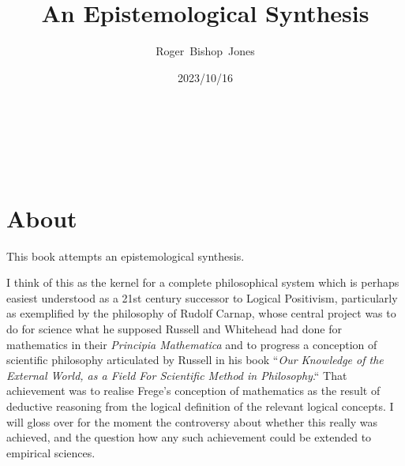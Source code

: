 \documentclass[10pt,titlepage]{book}
\title{\bf An Epistemological Synthesis}
\author{Roger~Bishop~Jones}
\date{\small 2023/10/16}
\newcommand{\ignore}[1]{}
\begin{document}
% 
                               
\begin{titlepage}
\maketitle





\end{titlepage}

\ \

\ignore{
\begin{centering}
{}
\end{centering}
}%

\setcounter{tocdepth}{2}
{\parskip-0pt\tableofcontents}


\hfill
\ 
\pagebreak







\section*{About}

This book attempts an epistemological synthesis.

I think of this as the kernel for a complete philosophical system which is perhaps easiest understood as a 21st century successor to Logical Positivism, particularly as exemplified by the philosophy of Rudolf Carnap, whose central project was to do for science what he supposed Russell and Whitehead had done for mathematics in their \emph{Principia Mathematica} \cite{russell1913} and to progress a conception of scientific philosophy articulated by Russell in his book “\emph{Our Knowledge of the External World, as a Field For Scientific Method in Philosophy}.“ \cite{russell21}
That achievement was to realise Frege’s conception of mathematics as the result of deductive reasoning from the logical definition of the relevant logical concepts.  I will gloss over for the moment the controversy about whether this really was achieved, and the question how any such achievement could be extended to empirical sciences.
\end{document}
